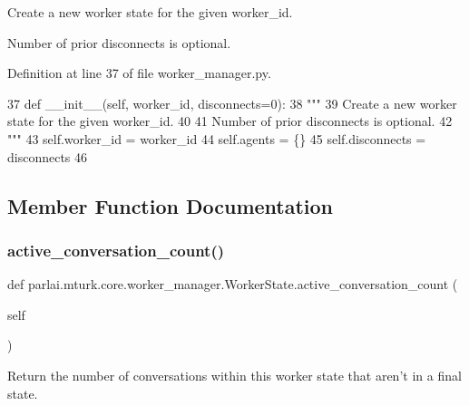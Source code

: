 \begin{DoxyVerb}Create a new worker state for the given worker_id.

Number of prior disconnects is optional.
\end{DoxyVerb}
 

Definition at line 37 of file worker\+\_\+manager.\+py.


\begin{DoxyCode}
37     \textcolor{keyword}{def }\_\_init\_\_(self, worker\_id, disconnects=0):
38         \textcolor{stringliteral}{"""}
39 \textcolor{stringliteral}{        Create a new worker state for the given worker\_id.}
40 \textcolor{stringliteral}{}
41 \textcolor{stringliteral}{        Number of prior disconnects is optional.}
42 \textcolor{stringliteral}{        """}
43         self.worker\_id = worker\_id
44         self.agents = \{\}
45         self.disconnects = disconnects
46 
\end{DoxyCode}


\subsection{Member Function Documentation}
\mbox{\label{classparlai_1_1mturk_1_1core_1_1worker__manager_1_1WorkerState_adf199dbdc37d1a6a00365b31632f30d0}} 
\subsubsection{\texorpdfstring{active\+\_\+conversation\+\_\+count()}{active\_conversation\_count()}}
{\footnotesize\ttfamily def parlai.\+mturk.\+core.\+worker\+\_\+manager.\+Worker\+State.\+active\+\_\+conversation\+\_\+count (\begin{DoxyParamCaption}\item[{}]{self }\end{DoxyParamCaption})}

\begin{DoxyVerb}Return the number of conversations within this worker state that aren't in a
final state.
\end{DoxyVerb}
 

